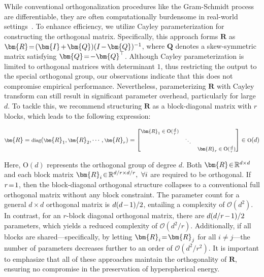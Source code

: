 While conventional orthogonalization procedures like the Gram-Schmidt process are differentiable, they are often computationally burdensome in real-world settings~\cite{liu2021orthogonal}. To enhance efficiency, we utilize Cayley parameterization for constructing the orthogonal matrix. Specifically, this approach forms $\bm{R}$ as $\thickmuskip=2mu \medmuskip=2mu \bm{R}=(\bm{I}+\bm{Q})(I-\bm{Q})^{-1}$, where $\bm{Q}$ denotes a skew-symmetric matrix satisfying $\thickmuskip=2mu \medmuskip=2mu \bm{Q}=-\bm{Q}^\top$. Although Cayley parameterization is limited to orthogonal matrices with determinant $1$, thus restricting the output to the special orthogonal group, our observations indicate that this does not compromise empirical performance. Nevertheless, parameterizing $\bm{R}$ with Cayley transform can still result in significant parameter overhead, particularly for large $d$. To tackle this, we recommend structuring $\bm{R}$ as a block-diagonal matrix with $r$ blocks, which leads to the following expression:

\begin{equation}
    \footnotesize
    \bm{R}=\text{diag}(\bm{R}_1,\bm{R}_2,\cdots,\bm{R}_r)=\begin{bmatrix}
    \bm{R}_1\in \text{O}(\frac{d}{r}) &  &\\
    &\ddots & \\
    & & \bm{R}_r\in \text{O}(\frac{d}{r})
    \end{bmatrix}\in \text{O}(d)
\end{equation}

Here, $\text{O}(d)$ represents the orthogonal group of degree $d$. Both $\thickmuskip=2mu \medmuskip=2mu \bm{R}\in\mathbb{R}^{d\times d}$ and each block matrix $\thickmuskip=2mu \medmuskip=2mu \bm{R}_i\in\mathbb{R}^{d/r\times d/r},~\forall i$ are required to be orthogonal. If $\thickmuskip=2mu \medmuskip=2mu r=1$, then the block-diagonal orthogonal structure collapses to a conventional full orthogonal matrix without any block constraint. The parameter count for a general $d\times d$ orthogonal matrix is $\thickmuskip=2mu \medmuskip=2mu d(d-1)/2$, entailing a complexity of $\mathcal{O}(d^2)$. In contrast, for an $r$-block diagonal orthogonal matrix, there are $\thickmuskip=2mu \medmuskip=2mu d(d/r-1)/2$ parameters, which yields a reduced complexity of $\mathcal{O}(d^2/r)$. Additionally, if all blocks are shared—specifically, by letting $\thickmuskip=2mu \medmuskip=2mu\bm{R}_i=\bm{R}_j$ for all $i\neq j$—the number of parameters decreases further to an order of $\mathcal{O}(d^2/r^2)$. It is important to emphasize that all of these approaches maintain the orthogonality of $\bm{R}$, ensuring no compromise in the preservation of hyperspherical energy.

